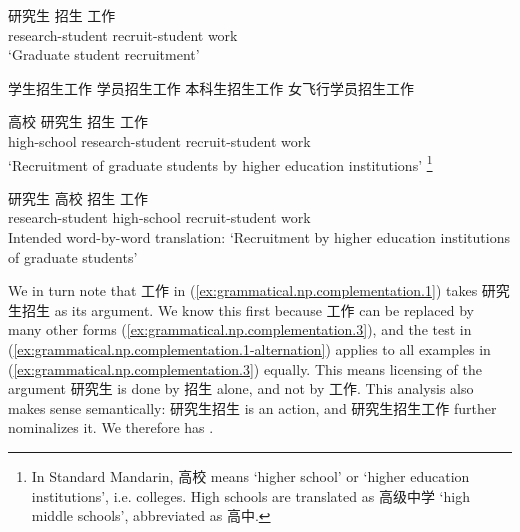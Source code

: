 \documentclass[UTF8, a4paper, oneside, scheme=plain, 12pt]{ctexrep}
\newcommand{\translate}[1]{`#1'}
\begin{document}
\begin{exe}
    \ex\label{ex:grammatical.np.complementation.1}
    \gll 研究生 招生 工作 \\
    research-student recruit-student work \\
    \glt\translate{Graduate student recruitment} 

    \ex\label{ex:grammatical.np.complementation.1.2}\begin{xlist}
        \ex 学生招生工作
        \ex 学员招生工作
        \ex 本科生招生工作
        \ex 女飞行学员招生工作
    \end{xlist}
    
    \ex\label{ex:grammatical.np.complementation.1-alternation} \begin{xlist}
        \ex \label{ex:grammatical.np.complementation.1-alternation.1}
        \gll 高校 研究生 招生 工作 \\
        high-school research-student recruit-student work \\
        \glt\translate{Recruitment of graduate students by higher education institutions}%
        \footnote{
            In Standard Mandarin, 高校 means \translate{higher school} 
            or \translate{higher education institutions}, i.e. colleges.
            High schools are translated as 高级中学 \translate{high middle schools},
            abbreviated as 高中.
        }

        \ex \label{ex:grammatical.np.complementation.1-alternation.2}
        \gll *研究生 高校 招生 工作 \\
        research-student high-school recruit-student work \\
        \glt Intended word-by-word translation: \translate{Recruitment by higher education institutions of graduate students}
    \end{xlist}
\end{exe}

We in turn note that 工作 in (\ref{ex:grammatical.np.complementation.1}) takes 研究生招生 as its argument.
We know this first because 工作 can be replaced by many other forms 
(\ref{ex:grammatical.np.complementation.3}),
and the test in (\ref{ex:grammatical.np.complementation.1-alternation})
applies to all examples in (\ref{ex:grammatical.np.complementation.3}) equally.
This means licensing of the argument 研究生 is done by 招生 alone,
and not by 工作.
This analysis also makes sense semantically:
研究生招生 is an action, and 研究生招生工作 further nominalizes it.
We therefore has .
\end{document}
